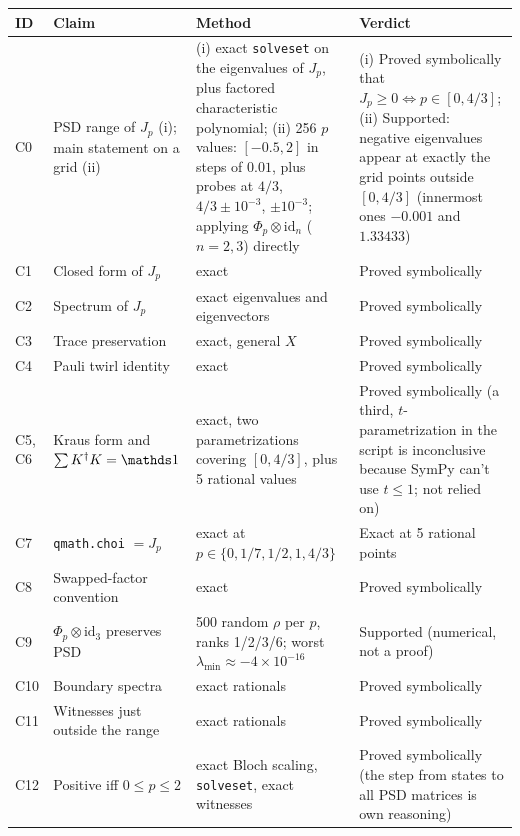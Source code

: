 \documentclass[11pt]{article}
\begin{document}
\begin{center}
\small
\begin{tabular}{p{1.1cm}p{3.5cm}p{5cm}p{5cm}}
\hline
\textbf{ID} & \textbf{Claim} & \textbf{Method} & \textbf{Verdict} \\ \hline
C0 & PSD range of $J_p$ (i); main statement on a grid (ii)
   & (i) exact \texttt{solveset} on the eigenvalues of $J_p$, plus factored characteristic
     polynomial; (ii) 256 $p$ values: $[-0.5,2]$ in steps of $0.01$, plus probes at $4/3$, $4/3\pm10^{-3}$, $\pm10^{-3}$; applying
     $\Phi_p\otimes\mathrm{id}_n$ ($n=2,3$) directly
   & (i) Proved symbolically that $J_p\ge0\iff p\in[0,4/3]$; (ii) Supported: negative
     eigenvalues appear at exactly the grid points outside $[0,4/3]$ (innermost ones $-0.001$
     and $1.33433$) \\
C1 & Closed form of $J_p$ & exact & Proved symbolically \\
C2 & Spectrum of $J_p$ & exact eigenvalues and eigenvectors & Proved symbolically \\
C3 & Trace preservation & exact, general $X$ & Proved symbolically \\
C4 & Pauli twirl identity & exact & Proved symbolically \\
C5, C6 & Kraus form and $\sum K\dg K=\id$
   & exact, two parametrizations covering $[0,4/3]$, plus 5 rational values
   & Proved symbolically (a third, $t$-parametrization in the script is inconclusive because
     SymPy can't use $t\le1$; not relied on) \\
C7 & \texttt{qmath.choi} $=J_p$ & exact at $p\in\{0,1/7,1/2,1,4/3\}$
   & Exact at 5 rational points \\
C8 & Swapped-factor convention & exact & Proved symbolically \\
C9 & $\Phi_p\otimes\mathrm{id}_3$ preserves PSD
   & 500 random $\rho$ per $p$, ranks 1/2/3/6; worst $\lambda_{\min}\approx-4\times10^{-16}$
   & Supported (numerical, not a proof) \\
C10 & Boundary spectra & exact rationals & Proved symbolically \\
C11 & Witnesses just outside the range & exact rationals & Proved symbolically \\
C12 & Positive iff $0\le p\le2$ & exact Bloch scaling, \texttt{solveset}, exact witnesses
    & Proved symbolically (the step from states to all PSD matrices is own reasoning) \\
\hline
\end{tabular}
\end{center}
\end{document}
